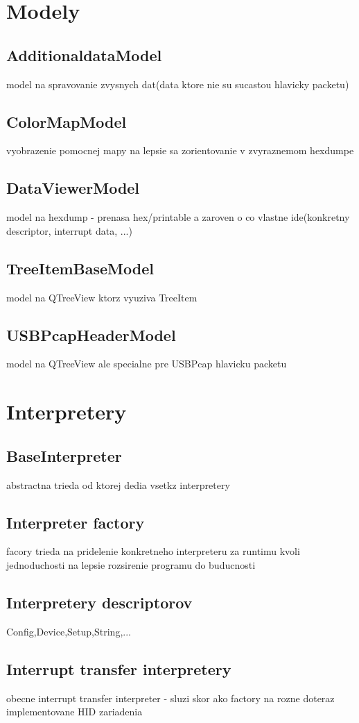 \section{Modely}
\subsection{AdditionaldataModel}
model na spravovanie zvysnych dat(data ktore nie su sucastou hlavicky packetu)
\subsection{ColorMapModel}
vyobrazenie pomocnej mapy na lepsie sa zorientovanie v zvyraznemom hexdumpe
\subsection{DataViewerModel}
model na hexdump - prenasa hex/printable a zaroven o co vlastne ide(konkretny descriptor, interrupt data, ...)
\subsection{TreeItemBaseModel}
model na QTreeView ktorz vyuziva TreeItem
\subsection{USBPcapHeaderModel}
model na QTreeView ale specialne pre USBPcap hlavicku packetu
\section{Interpretery}
\subsection{BaseInterpreter}
abstractna trieda od ktorej dedia vsetkz interpretery
\subsection{Interpreter factory}
facory trieda na pridelenie konkretneho interpreteru za runtimu kvoli jednoduchosti na lepsie rozsirenie programu do buducnosti
\subsection{Interpretery descriptorov}
Config,Device,Setup,String,...
\subsection{Interrupt transfer interpretery}
obecne interrupt transfer interpreter - sluzi skor ako factory na rozne doteraz implementovane HID zariadenia
